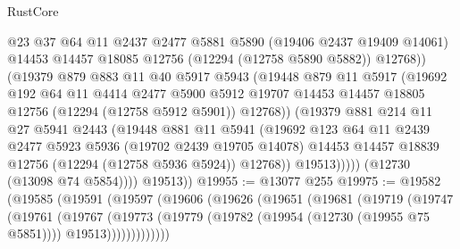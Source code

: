 \begin{lexlean}{RustCore}
\begin{coremodule}
                      @23
                      @37
                      @64
                      @11
                      @2437
                      @2477
                      @5881
                      @5890
                      (@19406 @2437 @19409 @14061)
                      @14453
                      @14457
                      @18085
                      @12756
                      (@12294 (@12758 @5890 @5882))
                      @12768))
                  (@19379
                    @879
                    @883
                    @11
                    @40
                    @5917
                    @5943
                    (@19448
                      @879
                      @11
                      @5917
                      (@19692
                        @192
                        @64
                        @11
                        @4414
                        @2477
                        @5900
                        @5912
                        @19707
                        @14453
                        @14457
                        @18805
                        @12756
                        (@12294 (@12758 @5912 @5901))
                        @12768))
                    (@19379
                      @881
                      @214
                      @11
                      @27
                      @5941
                      @2443
                      (@19448
                        @881
                        @11
                        @5941
                        (@19692
                          @123
                          @64
                          @11
                          @2439
                          @2477
                          @5923
                          @5936
                          (@19702 @2439 @19705 @14078)
                          @14453
                          @14457
                          @18839
                          @12756
                          (@12294 (@12758 @5936 @5924))
                          @12768))
                      @19513)))))
            (@12730 (@13098 @74 @5854))))
        @19513))
@19955 := @13077 @255
@19975 := @19582
    (@19585
      (@19591
        (@19597
          (@19606
            (@19626
              (@19651
                (@19681
                  (@19719
                    (@19747
                      (@19761
                        (@19767
                          (@19773
                            (@19779
                              (@19782 (@19954 (@12730 (@19955 @75 @5851))))
                              @19513)))))))))))))

\end{coremodule}
\end{lexlean}
